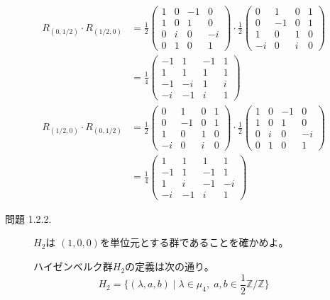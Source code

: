 \documentclass[12pt,b5paper]{ltjsarticle}
\begin{document}
\begin{description}
\begin{description}
\begin{align}
 R_{(0,1/2)}\cdot R_{(1/2,0)}
 &=
\frac{1}{2}
\begin{pmatrix}
1 & 0 & -1 & 0 \\
1 & 0 & 1 & 0 \\
0 & i & 0 & -i \\
0 & 1 & 0 & 1
\end{pmatrix}
\cdot
\frac{1}{2}
\begin{pmatrix}
0 & 1 & 0 & 1 \\
0 & -1 & 0 & 1 \\
1 & 0 & 1 & 0 \\
-i & 0 & i & 0
\end{pmatrix}\\
& =
\frac{1}{4}
\begin{pmatrix}
 -1 & 1 & -1 & 1 \\
1 & 1 & 1 & 1 \\
-1 & -i & 1 & i \\
-i & -1 & i & 1
\end{pmatrix}
 \\
R_{(1/2,0)} \cdot R_{(0,1/2)}
 &=
\frac{1}{2}
\begin{pmatrix}
0 & 1 & 0 & 1 \\
0 & -1 & 0 & 1 \\
1 & 0 & 1 & 0 \\
-i & 0 & i & 0
\end{pmatrix}
\cdot
\frac{1}{2}
\begin{pmatrix}
1 & 0 & -1 & 0 \\
1 & 0 & 1 & 0 \\
0 & i & 0 & -i \\
0 & 1 & 0 & 1
\end{pmatrix}\\
&=
\frac{1}{4}
\begin{pmatrix}
 1 & 1 & 1 & 1 \\
-1 & 1 & -1 & 1 \\
1 & i & -1 & -i \\
-i & -1 & i & 1
\end{pmatrix}
\end{align}

\hrulefill

  \item[問題 1.2.2.]
             $H_{2}$は
             $(1,0,0)$を単位元とする群であることを確かめよ。

\dotfill

ハイゼンベルク群$H_{2}$の定義は次の通り。
\begin{equation}
 H_{2}
  = \{ (\lambda,a,b) \mid \lambda\in\mu_{4},\;
  a,b\in\frac{1}{2}\mathbb{Z}/\mathbb{Z}\}
\end{equation}


\end{description}
\end{description}
\end{document}
